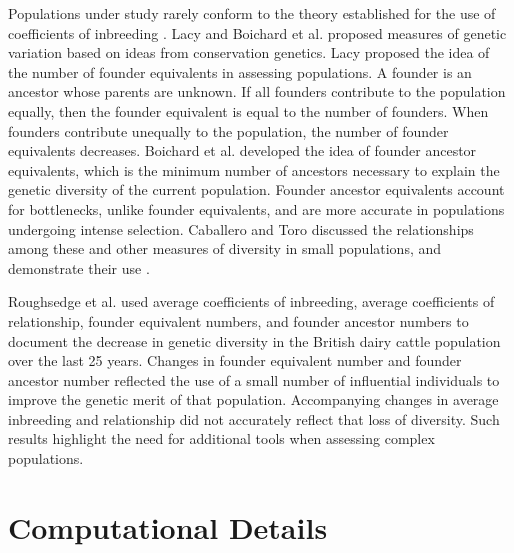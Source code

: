 Populations under study rarely conform to the theory established for the use of coefficients of inbreeding \cite{Wright1931}.
Lacy \citeyear{ref640} and Boichard et al. \citeyear{ref352} proposed measures of genetic variation based on ideas from
conservation genetics. Lacy \citeyear{ref640} proposed the idea of the number of founder equivalents in assessing
populations. A founder is an ancestor whose parents are unknown. If all founders contribute to the population equally, then the
founder equivalent is equal to the number of founders. When founders contribute unequally to the population, the number of
founder equivalents decreases. Boichard et al. \citeyear{ref352} developed the idea of founder ancestor equivalents, which is
the minimum number of ancestors necessary to explain the genetic diversity of the current population. Founder ancestor
equivalents account for bottlenecks, unlike founder equivalents, and are more accurate in populations undergoing intense
selection.  Caballero and Toro \citeyear{ref817} discussed the relationships among these and other measures of diversity in
small populations, and demonstrate their use \cite{ref435}.

Roughsedge et al. \citeyear{ref641} used average coefficients of inbreeding, average coefficients of relationship, founder
equivalent numbers, and founder ancestor numbers to document the decrease in genetic diversity in the British dairy cattle
population over the last 25 years. Changes in founder equivalent number and founder ancestor number reflected the use of a
small number of influential individuals to improve the genetic merit of that population. Accompanying changes in average
inbreeding and relationship did not accurately reflect that loss of diversity. Such results highlight the need for additional
tools when assessing complex populations.
\section{Computational Details}
\label{sec:methodology-computational-details}
